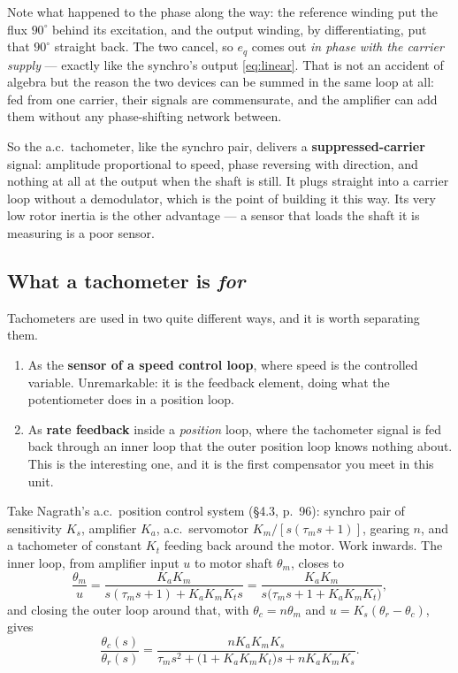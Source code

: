 \documentclass[11pt,a4paper]{article}
\begin{document}
Note what happened to the phase along the way: the reference winding put the
flux $90^\circ$ behind its excitation, and the output winding, by
differentiating, put that $90^\circ$ straight back. The two cancel, so
$e_{q}$ comes out \emph{in phase with the carrier supply} --- exactly like the
synchro's output \eqref{eq:linear}. That is not an accident of algebra but the
reason the two devices can be summed in the same loop at all: fed from one
carrier, their signals are commensurate, and the amplifier can add them
without any phase-shifting network between.

So the a.c.\ tachometer, like the synchro pair, delivers a
\textbf{suppressed-carrier} signal: amplitude proportional to speed, phase
reversing with direction, and nothing at all at the output when the shaft is
still. It plugs straight into a carrier loop without a demodulator, which is
the point of building it this way. Its very low rotor inertia is the other
advantage --- a sensor that loads the shaft it is measuring is a poor sensor.

\subsection{What a tachometer is \emph{for}}
\label{sss:ratefb}

Tachometers are used in two quite different ways, and it is worth separating
them.

\begin{enumerate}[leftmargin=2em,itemsep=2pt]
\item As the \textbf{sensor of a speed control loop}, where speed is the
      controlled variable. Unremarkable: it is the feedback element, doing what
      the potentiometer does in a position loop.
\item As \textbf{rate feedback} inside a \emph{position} loop, where the
      tachometer signal is fed back through an inner loop that the outer
      position loop knows nothing about. This is the interesting one, and it is
      the first compensator you meet in this unit.
\end{enumerate}

Take Nagrath's a.c.\ position control system (\S4.3, p.~96): synchro pair of
sensitivity $K_{s}$, amplifier $K_{a}$, a.c.\ servomotor
$K_{m}/[s(\tau_{m}s+1)]$, gearing $n$, and a tachometer of constant $K_{t}$
feeding back around the motor. Work inwards. The inner loop, from amplifier
input $u$ to motor shaft $\theta_{m}$, closes to
\[
  \frac{\theta_{m}}{u}
   =\frac{K_{a}K_{m}}{s(\tau_{m}s+1)+K_{a}K_{m}K_{t}s}
   =\frac{K_{a}K_{m}}{s\big(\tau_{m}s+1+K_{a}K_{m}K_{t}\big)} ,
\]
and closing the outer loop around that, with $\theta_{c}=n\theta_{m}$ and
$u=K_{s}(\theta_{r}-\theta_{c})$, gives
\begin{equation}
  \frac{\theta_{c}(s)}{\theta_{r}(s)}
   =\frac{nK_{a}K_{m}K_{s}}
         {\tau_{m}s^{2}+\big(1+K_{a}K_{m}K_{t}\big)s+nK_{a}K_{m}K_{s}} .
  \label{eq:ratefb}
\end{equation}
\end{document}
